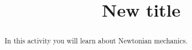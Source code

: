 \documentclass{ximera}
\title{New title}
\begin{document}
  \begin{abstract}
    In this activity you will learn about Newtonian mechanics.
  \end{abstract}
  \maketitle

  
\end{document}
